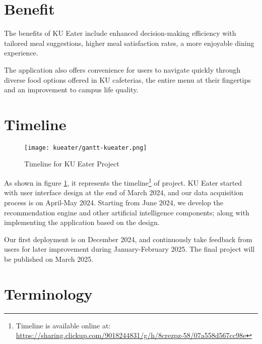 \newpage

\section{Benefit}
\label{section:benefit}

The benefits of KU Eater include enhanced decision-making efficiency with tailored meal suggestions,
higher meal satisfaction rates, a more enjoyable dining experience.

The application also offers convenience for users to navigate quickly through diverse food options offered in KU cafeterias,
the entire menu at their fingertips and an improvement to campus life quality.

\section{Timeline}
\label{section:timeline}

\begin{figure}[h!]
    \centering
    \texttt{[image: kueater/gantt-kueater.png]}
    \caption{Timeline for KU Eater Project}
    \label{fig:timeline}
\end{figure}

As shown in figure \ref{fig:timeline}, it represents the timeline\footnote{Timeline is available online at: \url{https://sharing.clickup.com/9018244831/g/h/8crezpz-58/07a558d567cc98e}} of project.
KU Eater started with user interface design at the end of March 2024, and our data acquisition process is on April-May 2024. Starting from June 2024, we develop
the recommendation engine and other artificial intelligence components; along with implementing the application based on the design.

Our first deployment is on December 2024, and continuously take feedback from users for later improvement during January-February 2025. The final project
will be published on March 2025.

\section{Terminology}
\label{section:terminology}

